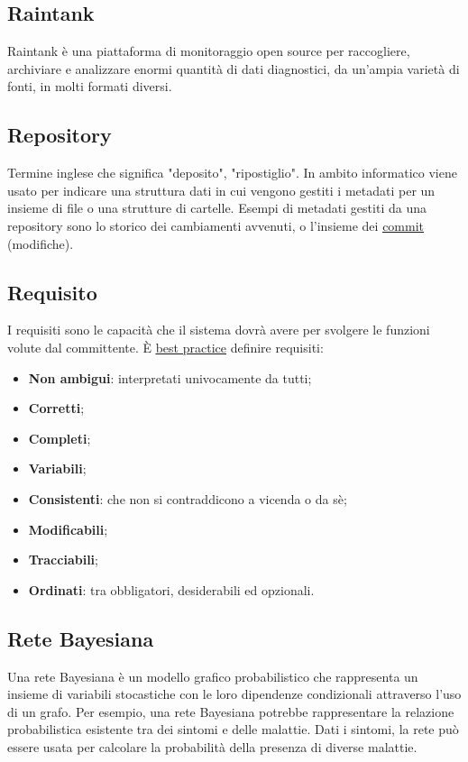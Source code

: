 		
	\newpage


	\subsection{Raintank}
	\label{sec:raintank}
	Raintank è una piattaforma di monitoraggio open source per raccogliere, archiviare e analizzare enormi quantità di dati diagnostici, da un'ampia varietà di fonti, in molti formati diversi.


	\subsection{Repository}
	\label{sec:repo}
	Termine inglese che significa "deposito", "ripostiglio". In ambito informatico viene usato per indicare una struttura dati in cui vengono gestiti i metadati per un insieme di file o una strutture di cartelle. Esempi di metadati gestiti da una repository sono lo storico dei cambiamenti avvenuti, o l'insieme dei \underline{\hyperref[sec:commit]{commit}} (modifiche).


	\subsection{Requisito}
	\label{sec:requisito}
	I requisiti sono le capacità che il sistema dovrà avere per svolgere le funzioni volute dal committente. È \underline{\hyperref[sec:bestpractice]{best practice}} definire requisiti:
	\begin{itemize}
	\item \textbf{Non ambigui}: interpretati univocamente da tutti;
	\item \textbf{Corretti};
	\item \textbf{Completi};
	\item \textbf{Variabili};
	\item \textbf{Consistenti}: che non si contraddicono a vicenda o da sè;
	\item \textbf{Modificabili};
	\item \textbf{Tracciabili};
	\item \textbf{Ordinati}: tra obbligatori, desiderabili ed opzionali.
	\end{itemize}


	\subsection{Rete Bayesiana}
	\label{sec:retebayes}
	Una rete Bayesiana è un modello grafico probabilistico che rappresenta un insieme di variabili stocastiche con le loro dipendenze condizionali attraverso l'uso di un grafo. Per esempio, una rete Bayesiana potrebbe rappresentare la relazione probabilistica esistente tra dei sintomi e delle malattie. Dati i sintomi, la rete può essere usata per calcolare la probabilità della presenza di diverse malattie.

